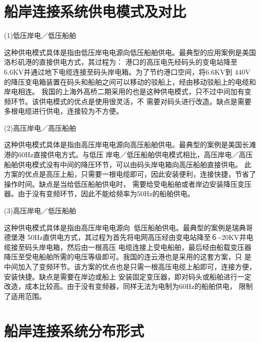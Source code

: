 \section{船岸连接系统供电模式及对比}

(1)低压岸电／低压船舶

这种供电模式具体是指由低压岸电电源向低压船舶供电。最典型的应用案例是美国洛杉矶港的直接供电方式，其过程为：
港口的高压电先经码头的变电站降至6.6KV并通过地下电缆连接至码头岸电箱。为了节约港口空间，将6.6KV到
440V的降压变电箱装置在码头和船舶之间可以移动的驳船上，经由移动驳船上的电缆和岸电相连。
我国的上海外高桥二期采用的也是这种供电模式，只不过中间加有变频环节。该供电模式的优点是使用很灵活，不
需要对码头进行改造。缺点是需要多根电缆进行供电，连接较为不方便。

(2)高压岸电／高压船舶

这种供电模式具体是指由高压岸电电源向高压船舶供电。最典型的案例是美国长滩港的60Hz直接供电方式。与低压
岸电／低压船舶供电模式相比，高压岸电／高压船舶供电模式没有中间的降压环节，可以由码头岸电箱向高压船舶直接供电。
此方案的优点是高压上船，只需要一根电缆即可，因此安装便利，连接快捷，节省了操作时间。缺点是当给低压船舶供电时，
需要给受电船舶或者岸边安装降压变压器。由于没有变频环节，因此不能给频率为50Hz的船舶供电。

(3)高压岸电／低压船舶

这种供电模式具体是指由高压岸电电源向低压船舶供电。最典型的案例是瑞典哥德堡港
50Hz直供电方式，其过程为首先将电网高压经由变电站降至６\~{}20KV并电缆接至码头岸电箱，然后由一根高压
电缆连接上受电船舶，最后经由船载变压器降压至受电船舶所需的电压等级即可。我国的连云港也是采用的这套方案，只
是中间加入了变频环节。该方案的优点也是只需一根高压电缆上船即可，连接方便，安装快捷。缺点是需要在岸边或船上
安装固定变压器，即对码头或船舶进行一定改造，成本比较高。由于没有变频器，同样无法为电制为60Hz的船舶供电，
限制了适用范围。

\begin{table}[!htp]
	\centering
	\caption[船用岸电供电方式比较]{船用岸电供电方式比较}
	\label{tab:船用岸电供电方式比较}
\end{table}


\section{船岸连接系统分布形式}

